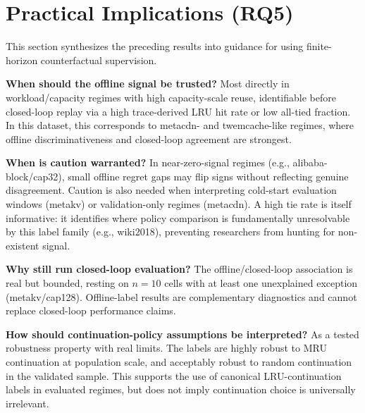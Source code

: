\section{Practical Implications (RQ5)}
\label{sec:practical-implications}

This section synthesizes the preceding results into guidance for using finite-horizon counterfactual supervision.

\textbf{When should the offline signal be trusted?} Most directly in workload/capacity regimes with high capacity-scale reuse, identifiable before closed-loop replay via a high trace-derived LRU hit rate or low all-tied fraction. In this dataset, this corresponds to metacdn- and twemcache-like regimes, where offline discriminativeness and closed-loop agreement are strongest.

\textbf{When is caution warranted?} In near-zero-signal regimes (e.g., alibaba-block/cap32), small offline regret gaps may flip signs without reflecting genuine disagreement. Caution is also needed when interpreting cold-start evaluation windows (metakv) or validation-only regimes (metacdn). A high tie rate is itself informative: it identifies where policy comparison is fundamentally unresolvable by this label family (e.g., wiki2018), preventing researchers from hunting for non-existent signal.

\textbf{Why still run closed-loop evaluation?} The offline/closed-loop association is real but bounded, resting on $n=10$ cells with at least one unexplained exception (metakv/cap128). Offline-label results are complementary diagnostics and cannot replace closed-loop performance claims.

\textbf{How should continuation-policy assumptions be interpreted?} As a tested robustness property with real limits. The labels are highly robust to MRU continuation at population scale, and acceptably robust to random continuation in the validated sample. This supports the use of canonical LRU-continuation labels in evaluated regimes, but does not imply continuation choice is universally irrelevant.
